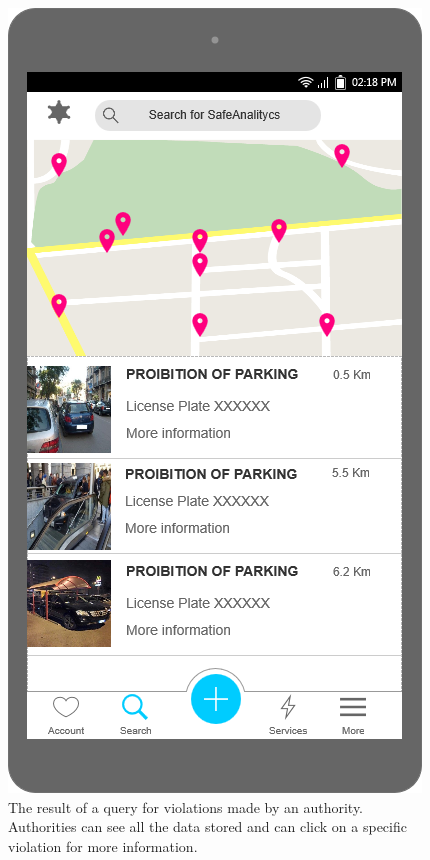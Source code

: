 \documentclass[a4paper]{article}
\newcommand{\mockupheight}{0.4\textheight}
\begin{document}
\begin{figure}[H]
\centering
\includegraphics[height=\mockupheight]{mockup/get_violations}
\caption{The result of a query for violations made by an
authority. Authorities can see all the data stored and can click on a
specific violation for more information.}
\end{figure}
\end{document}
